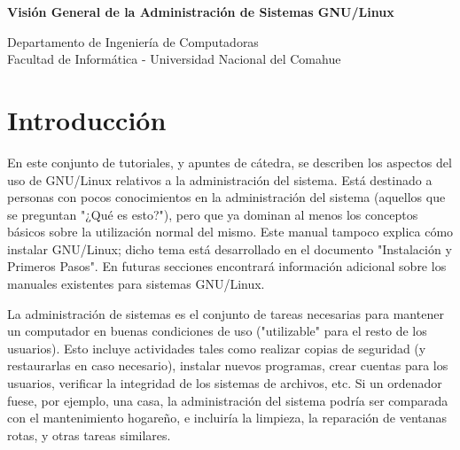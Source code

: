 ﻿%
\usepackage{fancyhdr}
	\pagestyle{fancy}
\usepackage{lastpage}	
	\lhead{}
	\chead{}
	\rhead{}
	\cfoot{}
	\rfoot{\footnotesize \thepage\ }	%
	\renewcommand{\headrulewidth}{0.0pt}
	\renewcommand{\footrulewidth}{0.4pt}

\def\ti#1#2{\texttt{#1} & #2 \\ }





\setlength{\parindent}{0pt}


\makeatletter
{\color{bl} \centering \huge \sc \textbf{
Visión General de la Administración de Sistemas GNU/Linux \\
\vspace*{8pt} }\par}
\makeatother


\makeatletter
{\centering \small 
	Departamento de Ingeniería de Computadoras \\
	Facultad de Informática - Universidad Nacional del Comahue \\
	\vspace{20pt} }
\makeatother




\section{Introducción}

En este conjunto de tutoriales, y apuntes de cátedra,
se describen los aspectos del uso de GNU/Linux relativos a la administración del
sistema. Está destinado a personas con pocos conocimientos en la
administración del sistema (aquellos que se preguntan "¿Qué es esto?"), pero que ya dominan
al menos los conceptos básicos sobre la utilización normal del mismo. Este
manual tampoco explica cómo instalar GNU/Linux; dicho tema está desarrollado en
el documento "Instalación y Primeros Pasos". En futuras secciones encontrará información
adicional sobre los manuales existentes para sistemas GNU/Linux.  

La administración de sistemas es el conjunto de tareas necesarias para
mantener un computador en buenas condiciones de uso ("utilizable" para el resto
de los usuarios). Esto incluye actividades
tales como realizar copias de seguridad (y restaurarlas en caso necesario),
instalar nuevos programas, crear cuentas para los usuarios,
verificar la integridad de los sistemas de archivos, etc. Si un ordenador
fuese, por ejemplo, una casa, la administración del sistema podría ser comparada
con el 
mantenimiento hogareño, e incluiría la limpieza, la reparación de ventanas rotas, y otras
tareas similares.  

